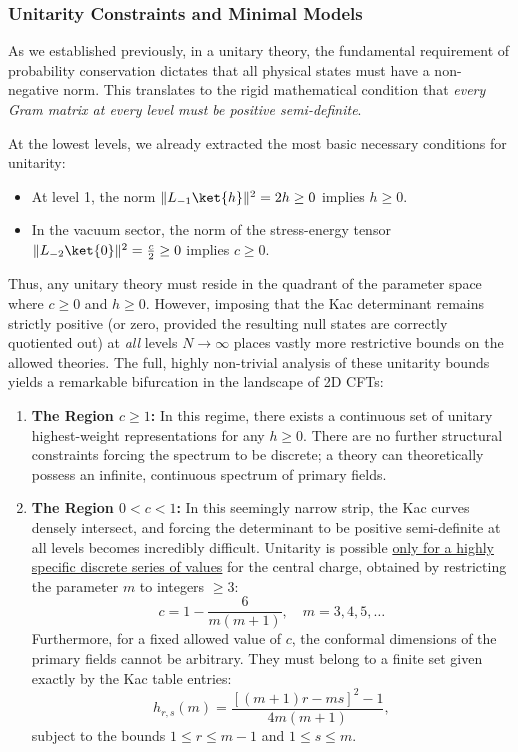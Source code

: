 \subsubsection{Unitarity Constraints and Minimal Models}

As we established previously, in a unitary theory, the fundamental requirement of probability conservation dictates that all physical states must have a non-negative norm. This translates to the rigid mathematical condition that \textit{every Gram matrix at every level must be positive semi-definite}.

At the lowest levels, we already extracted the most basic necessary conditions for unitarity:
\begin{itemize}
    \item At level 1, the norm $\|L_{-1}\ket{h}\|^2 = 2h \ge 0$ implies $h \ge 0$.
    \item In the vacuum sector, the norm of the stress-energy tensor $\|L_{-2}\ket{0}\|^2 = \frac{c}{2} \ge 0$ implies $c \ge 0$.
\end{itemize}

Thus, any unitary theory must reside in the quadrant of the parameter space where $c \ge 0$ and $h \ge 0$. However, imposing that the Kac determinant remains strictly positive (or zero, provided the resulting null states are correctly quotiented out) at \textit{all} levels $N \to \infty$ places vastly more restrictive bounds on the allowed theories. The full, highly non-trivial analysis of these unitarity bounds yields a remarkable bifurcation in the landscape of 2D CFTs:

\begin{enumerate}
    \item \textbf{The Region $c \ge 1$:} In this regime, there exists a continuous set of unitary highest-weight representations for any $h \ge 0$. There are no further structural constraints forcing the spectrum to be discrete; a theory can theoretically possess an infinite, continuous spectrum of primary fields.

    \item \textbf{The Region $0 < c < 1$:} In this seemingly narrow strip, the Kac curves densely intersect, and forcing the determinant to be positive semi-definite at all levels becomes incredibly difficult. Unitarity is possible \uline{only for a highly specific discrete series of values} for the central charge, obtained by restricting the parameter $m$ to integers $\ge 3$:
          \[
              c = 1 - \frac{6}{m(m+1)}, \quad m = 3, 4, 5, \dots
          \]
          Furthermore, for a fixed allowed value of $c$, the conformal dimensions of the primary fields cannot be arbitrary. They must belong to a finite set given exactly by the Kac table entries:
          \[
              h_{r,s}(m) = \frac{[(m+1)r - ms]^2 - 1}{4m(m+1)},
          \]
          subject to the bounds $1 \le r \le m-1$ and $1 \le s \le m$.
\end{enumerate}


